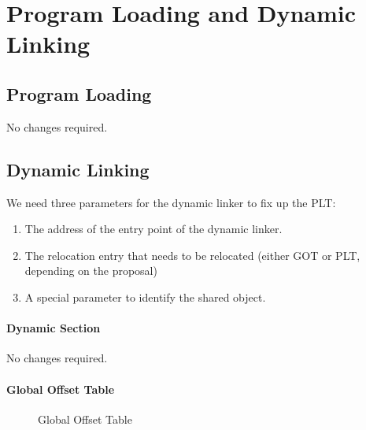 \chapter{Program Loading and Dynamic Linking}


\section{Program Loading}

No changes required.


\section{Dynamic Linking}

We need three parameters for the dynamic linker to fix up the
PLT:
\begin{enumerate}
\item The address of the entry point of the dynamic linker.
\item The relocation entry that needs to be relocated (either GOT or
  PLT, depending on the proposal)
\item A special parameter to identify the shared object.
\end{enumerate}



\subsubsection{Dynamic Section}

No changes required.

\subsubsection{Global Offset Table}



\begin{figure}[H]
\caption{Global Offset Table}
\begin{center}
\end{center}
\end{figure}

